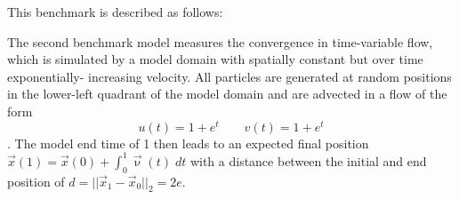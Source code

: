 This benchmark is described as follows:
\begin{displayquote}
The second benchmark model measures the convergence
in time-variable flow, which is simulated by a model domain 
with spatially constant but over time exponentially-
increasing velocity. All particles are generated at random
positions in the lower-left quadrant of the model domain
and are advected in a flow of the form
\[
u(t)=1 + e^t \qquad 
v(t)=1 + e^t 
\].
The model end time
of 1 then leads to an expected final
position $\vec{x}(1) = \vec{x}(0) + \int_0^1 \vec\upnu(t) \; dt$
 with a distance between the initial and end position of $d = ||\vec{x}_1-\vec{x}_0 ||_2 = 2e$.
\end{displayquote}








